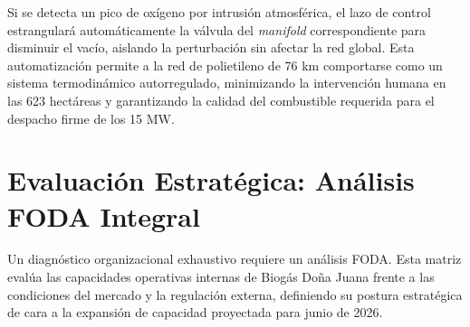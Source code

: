 \documentclass[11pt,letterpaper]{article}
\begin{document}
Si se detecta un pico de oxígeno por intrusión atmosférica, el lazo de control
estrangulará automáticamente la válvula del \textit{manifold} correspondiente
para disminuir el vacío, aislando la perturbación sin afectar la red global.
Esta automatización permite a la red de polietileno de 76 km comportarse como un
sistema termodinámico autorregulado, minimizando la intervención humana en las
623 hectáreas y garantizando la calidad del combustible requerida para el
despacho firme de los 15 MW.

\newpage

\section{Evaluación Estratégica: Análisis FODA Integral}

Un diagnóstico organizacional exhaustivo requiere un análisis FODA.  Esta matriz
evalúa las capacidades operativas internas de Biogás Doña Juana frente a las
condiciones del mercado y la regulación externa, definiendo su postura
estratégica de cara a la expansión de capacidad proyectada para junio de 2026.
\end{document}
